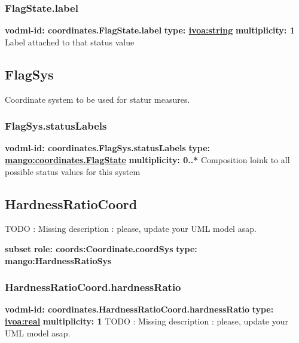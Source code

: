     \subsubsection{FlagState.label}
      \textbf{vodml-id: coordinates.FlagState.label} \newline
      \textbf{type: \hyperref[sect:ivoa]{ivoa:string}} \newline
      \textbf{multiplicity: 1} \newline 
      Label attached to that status value

  \subsection{FlagSys}
  \label{sect:coordinates.FlagSys}
    Coordinate system to be used for statur measures.

    \subsubsection{FlagSys.statusLabels}
      \textbf{vodml-id: coordinates.FlagSys.statusLabels} \newline
      \textbf{type: \hyperref[sect:coordinates.FlagState]{mango:coordinates.FlagState}} \newline
      \textbf{multiplicity: 0..*} \newline 
      Composition loink to all possible status values for this system

  \subsection{HardnessRatioCoord}
  \label{sect:coordinates.HardnessRatioCoord}
    TODO : Missing description : please, update your UML model asap.

    \noindent \textbf{subset} \newline
    \indent   \textbf{role: coords:Coordinate.coordSys} \newline
    \indent   \textbf{type: mango:HardnessRatioSys} \newline


    \subsubsection{HardnessRatioCoord.hardnessRatio}
      \textbf{vodml-id: coordinates.HardnessRatioCoord.hardnessRatio} \newline
      \textbf{type: \hyperref[sect:ivoa]{ivoa:real}} \newline
      \textbf{multiplicity: 1} \newline 
      TODO : Missing description : please, update your UML model asap.

